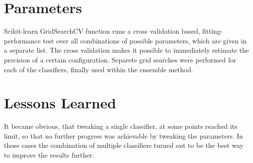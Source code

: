 \documentclass[a4paper, 11pt]{article}
\begin{document}
	\section{Parameters}
	Scikit-learn GridSearchCV function runs a cross validation based, fitting-performance test over all combinations of possible parameters, which are given in a separate list. The cross validation makes it possible to immediately estimate the precision of a certain configuration. Separete grid searches were performed for each of the classifiers, finally used within the ensemble method. 
	
	\section{Lessons Learned} 
	It became obvious, that tweaking a single classifier, at some points reached its limit, so that no further progress was achievable by tweaking the parameters. In those cases the combination of multiple classifiers turned out to be the best way to improve the results further. 
	
\end{document}
